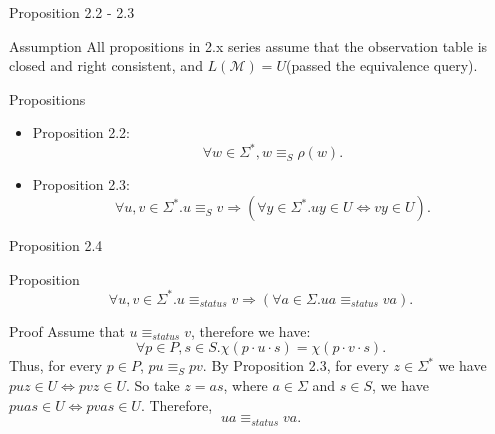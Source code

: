 \documentclass{beamer}
\begin{document}

\begin{frame}{Proposition 2.2 - 2.3}
    \begin{block}{Assumption}
        All propositions in 2.x series assume that the observation table is closed and right consistent, 
        and $L(\mathcal{M}) = U$(passed the equivalence query). 
    \end{block}

    \begin{block}{Propositions}
        \begin{itemize}
            \item Proposition 2.2:  
            \[
                \forall w \in \Sigma^*, w \equiv_S \rho(w).
            \]
            \item Proposition 2.3: 
             \[
                \forall u,v \in \Sigma^*. u \equiv_S v \Rightarrow (\forall y \in \Sigma^*. uy \in U \iff vy \in U). 
            \]
        \end{itemize}
    \end{block}
\end{frame}


\begin{frame}{Proposition 2.4}
    \begin{block}{Proposition}
        \[
            \forall u,v \in \Sigma^*. u \equiv_{status} v \Rightarrow (\forall a \in \Sigma. ua \equiv_{status} va).
        \]
    \end{block}
    \begin{block}{Proof}
        Assume that $u \equiv_{status} v$, therefore we have:
         \[
            \forall p\in P,s\in S. \chi(p\cdot u \cdot s) = \chi(p\cdot v \cdot s).
        \]
        Thus, for every $p \in P$, $pu \equiv_{S} pv$.
        By Proposition 2.3, for every $z \in \Sigma^*$ we have $puz \in U \iff pvz \in U$.
        So take $z = as$, where $a \in \Sigma$ and $s \in S$, we have $puas \in U \iff pvas \in U$.
        Therefore,
        \[
            ua \equiv_{status} va.
        \]
    \end{block}
\end{frame}
\end{document}
